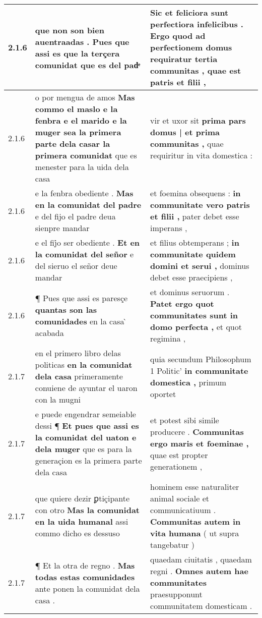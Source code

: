 \begin{tabular}{|p{1cm}|p{6.5cm}|p{6.5cm}|}
2.1.6 & que non son bien auentraadas . \textbf{ Pues que assi es que la terçera comunidat } que es del padͤ & Sic et feliciora sunt perfectiora infelicibus . \textbf{ Ergo quod ad perfectionem domus requiratur tertia communitas , } quae est patris et filii , \\\hline
2.1.6 & o por mengua de amos \textbf{ Mas commo el maslo e la fenbra e el marido e la muger sea la primera parte dela casar la primera comunidat } que es menester para la uida dela casa & vir et uxor sit \textbf{ prima pars domus | et prima communitas , } quae requiritur in vita domestica : \\\hline
2.1.6 & e la fenbra obediente . \textbf{ Mas en la comunidat del padre } e del fijo el padre deua sienpre mandar & et foemina obsequens : \textbf{ in communitate vero patris et filii , } pater debet esse imperans , \\\hline
2.1.6 & e el fij̉o ser obediente . \textbf{ Et en la comunidat del señor } e del sieruo el señor deue mandar & et filius obtemperans ; \textbf{ in communitate quidem domini et serui , } dominus debet esse praecipiens , \\\hline
2.1.6 & ¶ Pues que assi es paresçe \textbf{ quantas son las comunidades } en la casa ̀ acabada & et dominus seruorum . \textbf{ Patet ergo quot communitates sunt in domo perfecta , } et quot regimina , \\\hline
2.1.7 & en el primero libro delas politicas \textbf{ en la comunidat dela casa } primeramente conuiene de ayuntar el uaron con la mugni & quia secundum Philosophum 1 Politic’ \textbf{ in communitate domestica , } primum oportet \\\hline
2.1.7 & e puede engendrar semeiable dessi ¶ \textbf{ Et pues que assi es la comunidat del uaton e dela muger } que es para la generaçion es la primera parte dela casa & et potest sibi simile producere . \textbf{ Communitas ergo maris et foeminae , } quae est propter generationem , \\\hline
2.1.7 & que quiere dezir ꝑtiçipante con otro \textbf{ Mas la comunidat en la uida humanal } assi commo dicho es dessuso & hominem esse naturaliter animal sociale et communicatiuum . \textbf{ Communitas autem in vita humana } ( ut supra tangebatur ) \\\hline
2.1.7 & ¶ Et la otra de regno . \textbf{ Mas todas estas comunidades } ante ponen la comunidat dela casa . & quaedam ciuitatis , quaedam regni . \textbf{ Omnes autem hae communitates } praesupponunt communitatem domesticam . \\\hline

\end{tabular}
